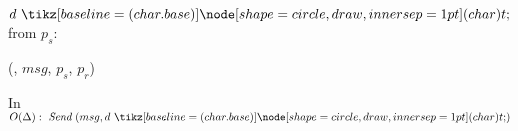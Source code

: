 \begin{bbox}[title={$\F_{\msf{sync-chan}}(p_s, p_r, r, \Delta)$}]

\OnInput {} $d \token$ from $p_s$:
	\begin{renumerate}
	\item {} (, $msg$, $p_s$, $p_r$)
	\item In $O(\Delta): ~\Send (msg, d \token)$
	\end{renumerate}
\end{bbox}
